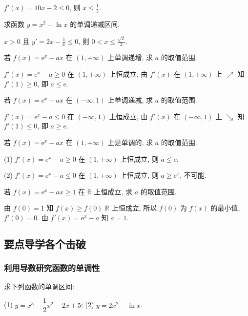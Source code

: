   \beginsolution
    $f'(x)=10x-2\leqslant 0$, 则 $x\leqslant \frac15$.
  \endsolution
  
  \begin{exercise}
    求函数 $y=x^2-\ln x$ 的单调递减区间.
  \end{exercise}

  \beginsolution
    $x>0$ 且 $y'=2x-\frac1x\leqslant 0$, 
    则 $0<x\leqslant \frac{\sqrt2}2$.
  \endsolution
  
  \begin{exercise}
    若 $f(x)=\mathrm{e}^x -ax$ 在 $(1,+\infty)$ 上单调递增,
    求 $a$ 的取值范围.
  \end{exercise}

  \beginsolution
    $f'(x)=\mathrm{e}^x-a\geqslant 0$ 在 $(1,+\infty)$ 上恒成立, 由 $f'(x)$ 在 $(1,+\infty)$ 上 $\nearrow$ 知 $f'(1)\geqslant 0$, 即 $a\leqslant \mathrm{e}$.
    
    \varexercise 若 $f(x)=\mathrm{e}^x -ax$ 在 $(-\infty,1)$ 上单调递减,
    求 $a$ 的取值范围.
    
    $f'(x)=\mathrm{e}^x-a\leqslant 0$ 在 $(-\infty,1)$ 上恒成立, 由 $f'(x)$ 在 $(-\infty,1)$ 上 $\searrow$ 知 $f'(1)\leqslant 0$, 即 $a\geqslant \mathrm{e}$.
    
    \varexercise 若 $f(x)=\mathrm{e}^x -ax$ 在 $(1,+\infty)$ 上是单调的,
    求 $a$ 的取值范围.
    
    (1) $f'(x)=\mathrm{e}^x-a\geqslant 0$ 在 $(1,+\infty)$ 上恒成立, 则 $a\leqslant \mathrm{e}$.
    
    (2) $f'(x)=\mathrm{e}^x-a\leqslant 0$ 在 $(1,+\infty)$ 上恒成立, 则 $a\geqslant \mathrm{e}^x$, 不可能.
  \endsolution
  
  \begin{exercise}
    若 $f(x)=\mathrm{e}^x -ax\geqslant 1$ 在 $\mathbb{R}$ 上恒成立,
    求 $a$ 的取值范围.
  \end{exercise}

  \beginsolution
    由 $f(0)=1$ 知 $f(x)\geqslant f(0)$ $\mathbb{R}$ 上恒成立, 所以 $f(0)$ 为 $f(x)$ 的最小值, $f'(0)=0$. 由 $f'(x)=\mathrm{e}^x-a$ 知 $a=1$.
  \endsolution
  
  \subsection{要点导学\quad 各个击破}
  \subsubsection{利用导数研究函数的单调性}
  \begin{example}
    求下列函数的单调区间:
    
    (1) $y=x^3 -\dfrac12 x^2-2x+5$;\qquad
    (2) $y=2x^2 -\ln x$.
  \end{example}


